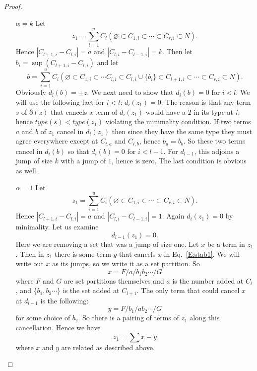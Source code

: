 \documentclass{amsart}
\begin{document}
\begin{proof}
\begin{enumerate}
     \item[$\alpha=k$]
        Let $$z_1 = \sum_{i=1}^u C_i (\varnothing \subset C_{1,i} \subset \cdots \subset C_{r,i} \subset 
        N).$$ Hence  
        $|C_{l+1, i} - C_{l, i}| = a$ and $|C_{l, i} - C_{l-1, i}| = k$.  Then let 
        $b_i = \sup(C_{l+1,i}-C_{l, i})$ and let $$b = \sum_{i=1}^u C_i (\varnothing \subset C_{1,i} \subset \cdots C_{l,i} 
        \subset C_{l,i} \cup \{b_i\} \subset C_{l+1, i} \subset \cdots \subset C_{r,i} \subset 
        N).$$ Obviously $d_l(b) = \pm z$. We next need to show that $d_i(b)=0$
        for $i < l$. We will use the following fact for $i< l$: $d_i(z_1)=0.$ The reason is that any term $s$ of $\partial(z)$ 
        that cancels a term of $d_i(z_1)$ would have a $2$ in its type at $i$, hence $type(s) < 
        type(z_1)$ violating the minimality condition. If two terms $a$ and $b$ of $z_1$ cancel in $d_i(z_1)$ then since they have 
        the same type they must agree everywhere except at $C_{i, a}$ and $C_{i, b}$, hence $b_a=b_b$. So these two terms cancel in $d_i(b)$
        so that $d_i(b)=0$ for $i < l-1$. For $d_{l-1}$, this adjoins a jump of size $k$ with a jump of $1$, hence is zero.
        The last condition is obvious as well.
     \item[$\alpha=1$] Let $$z_1 = \sum_{i=1}^u C_i (\varnothing \subset C_{1,i} \subset \cdots \subset C_{r,i} \subset 
        N).$$  Hence  
        $|C_{l+1, i} - C_{l, i}| = a$ and $|C_{l, i} - C_{l-1, i}| = 1$. 
        Again $d_i(z_1)=0$ by minimality. Let us examine 
        \begin{equation} \label{E:stab1}
          d_{l-1}(z_1) = 0.
        \end{equation}
        Here we are removing a set that was a jump of size one. Let $x$ be a term in $z_1$. Then in $z_1$ there is some term $y$ that 
        cancels $x$ in Eq.~\ref{E:stab1}. We will write out $x$ as its jumps, so we write it as a set partition. So 
        $$x= F/a/b_1b_2 \cdots /G$$ where $F$ and $G$ are set partitions themselves and $a$ is the number added at $C_l$, and 
        $\{b_1,b_2 \cdots \}$ is the set added at $C_{l+1}$. The only term that could cancel $x$ at $d_{l-1}$ is the following:
        $$y= F/b_1/ab_2 \cdots/G$$ for some choice of $b_2$. So there is a pairing of terms of $z_1$ along this cancellation. Hence we 
        have
        \begin{equation} \label{E:stab2}
          z_1 = \sum x - y
        \end{equation}
        where $x$ and $y$ are related as described above.  


\end{enumerate}
\end{proof}
\end{document}
